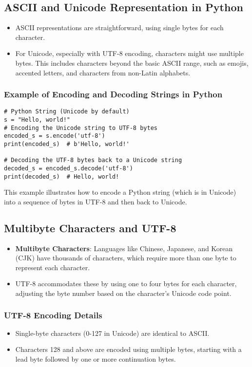 \documentclass{article}
\begin{document}
\subsection{ASCII and Unicode Representation in Python}
\begin{itemize}
    \item ASCII representations are straightforward, using single bytes for each character.
    \item For Unicode, especially with UTF-8 encoding, characters might use multiple bytes. This includes characters beyond the basic ASCII range, such as emojis, accented letters, and characters from non-Latin alphabets.
\end{itemize}

\subsubsection{Example of Encoding and Decoding Strings in Python}
\begin{verbatim}
# Python String (Unicode by default)
s = "Hello, world!"
# Encoding the Unicode string to UTF-8 bytes
encoded_s = s.encode('utf-8')
print(encoded_s)  # b'Hello, world!'

# Decoding the UTF-8 bytes back to a Unicode string
decoded_s = encoded_s.decode('utf-8')
print(decoded_s)  # Hello, world!
\end{verbatim}
This example illustrates how to encode a Python string (which is in Unicode) into a sequence of bytes in UTF-8 and then back to Unicode.

\subsection{Multibyte Characters and UTF-8}
\begin{itemize}
    \item \textbf{Multibyte Characters}: Languages like Chinese, Japanese, and Korean (CJK) have thousands of characters, which require more than one byte to represent each character.
    \item UTF-8 accommodates these by using one to four bytes for each character, adjusting the byte number based on the character’s Unicode code point.
\end{itemize}

\subsubsection{UTF-8 Encoding Details}
\begin{itemize}
    \item Single-byte characters (0-127 in Unicode) are identical to ASCII.
    \item Characters 128 and above are encoded using multiple bytes, starting with a lead byte followed by one or more continuation bytes.
\end{itemize}
\end{document}

